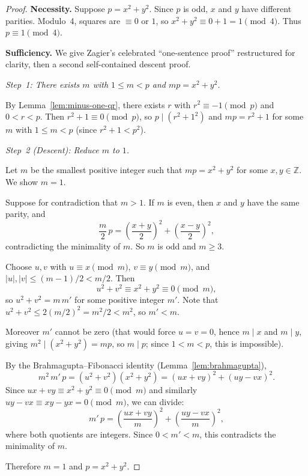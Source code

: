 \documentclass[12pt,a4paper,openany]{book}
\theoremstyle{definition}
\theoremstyle{plain}
\theoremstyle{remark}
\newcommand{\Z}{\mathbb{Z}}
\newcommand{\abs}[1]{\left|#1\right|}
\begin{document}
\begin{proof}
\textbf{Necessity.}
Suppose $p = x^2 + y^2$.  Since $p$ is odd, $x$ and $y$ have different parities.
Modulo~4, squares are $\equiv 0$ or $1$, so $x^2 + y^2 \equiv 0 + 1 = 1 \pmod{4}$.
Thus $p \equiv 1 \pmod{4}$.

\medskip
\textbf{Sufficiency.}
We give Zagier's celebrated ``one-sentence proof'' restructured for clarity,
then a second self-contained descent proof.

\smallskip
\textit{Step~1: There exists $m$ with $1 \le m < p$ and $mp = x^2 + y^2$.}

By Lemma~\ref{lem:minus-one-qr}, there exists $r$ with $r^2 \equiv -1 \pmod{p}$
and $0 < r < p$.  Then $r^2 + 1 \equiv 0 \pmod{p}$, so $p \mid (r^2 + 1^2)$
and $mp = r^2 + 1$ for some $m$ with $1 \le m < p$ (since $r^2 + 1 < p^2$).

\smallskip
\textit{Step~2 (Descent): Reduce $m$ to $1$.}

Let $m$ be the smallest positive integer such that $mp = x^2 + y^2$ for some
$x,y \in \Z$.  We show $m = 1$.

Suppose for contradiction that $m > 1$.  If $m$ is even, then $x$ and $y$ have
the same parity, and
\[
  \frac{m}{2}\,p = \left(\frac{x+y}{2}\right)^{\!2} + \left(\frac{x-y}{2}\right)^{\!2},
\]
contradicting the minimality of $m$.  So $m$ is odd and $m \ge 3$.

Choose $u,v$ with $u \equiv x \pmod{m}$, $v \equiv y \pmod{m}$, and
$\abs{u}, \abs{v} \le (m-1)/2 < m/2$.  Then
\[
  u^2 + v^2 \equiv x^2 + y^2 \equiv 0 \pmod{m},
\]
so $u^2 + v^2 = m\,m'$ for some positive integer $m'$.  Note that
$u^2 + v^2 \le 2(m/2)^2 = m^2/2 < m^2$, so $m' < m$.

Moreover $m'$ cannot be zero (that would force $u = v = 0$, hence $m \mid x$ and
$m \mid y$, giving $m^2 \mid (x^2+y^2) = mp$, so $m \mid p$; since $1 < m < p$,
this is impossible).

By the Brahmagupta--Fibonacci identity (Lemma~\ref{lem:brahmagupta}),
\[
  m^2\,m'\,p = (u^2+v^2)(x^2+y^2)
            = (ux+vy)^2 + (uy-vx)^2.
\]
Since $ux + vy \equiv x^2 + y^2 \equiv 0 \pmod{m}$ and similarly
$uy - vx \equiv xy - yx = 0 \pmod{m}$, we can divide:
\[
  m'\,p = \left(\frac{ux+vy}{m}\right)^{\!2}
        + \left(\frac{uy-vx}{m}\right)^{\!2},
\]
where both quotients are integers.  Since $0 < m' < m$, this contradicts
the minimality of $m$.

Therefore $m = 1$ and $p = x^2 + y^2$.
\end{proof}
\end{document}
